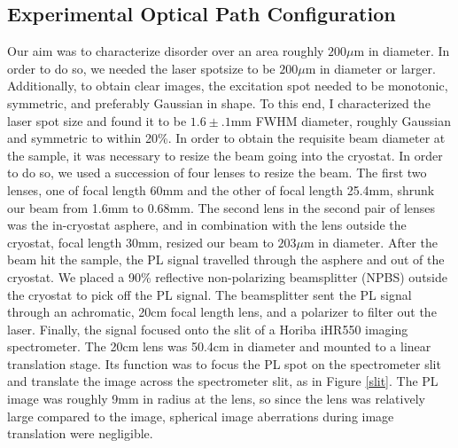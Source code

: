 \subsection{Experimental Optical Path Configuration}
\indent Our aim was to characterize disorder over an area roughly $200\mu$m in diameter. In order to do so, we needed the laser spotsize to be $200\mu$m in diameter or larger. Additionally, to obtain clear images, the excitation spot needed to be monotonic, symmetric, and preferably Gaussian in shape. To this end, I characterized the laser spot size and found it to be $1.6\pm.1$mm FWHM diameter, roughly Gaussian and symmetric to within 20\%. In order to obtain the requisite beam diameter at the sample, it was necessary to resize the beam going into the cryostat. In order to do so, we used a succession of four lenses to resize the beam. The first two lenses, one of focal length 60mm and the other of focal length 25.4mm, shrunk our beam from 1.6mm to 0.68mm. The second lens in the second pair of lenses was the in-cryostat asphere, and in combination with the lens outside the cryostat, focal length 30mm, resized our beam to $203\mu$m in diameter. After the beam hit the sample, the PL signal travelled through the asphere and out of the cryostat. We placed a 90\% reflective non-polarizing beamsplitter (NPBS) outside the cryostat to pick off the PL signal. The beamsplitter sent the PL signal through an achromatic, 20cm focal length lens, and a polarizer to filter out the laser. Finally, the signal focused onto the slit of a Horiba iHR550 imaging spectrometer. The 20cm lens was 50.4cm in diameter and mounted to a linear translation stage. Its function was to focus the PL spot on the spectrometer slit and translate the image across the spectrometer slit, as in Figure \ref{slit}. The PL image was roughly 9mm in radius at the lens, so since the lens was relatively large compared to the image, spherical image aberrations during image translation were negligible.

